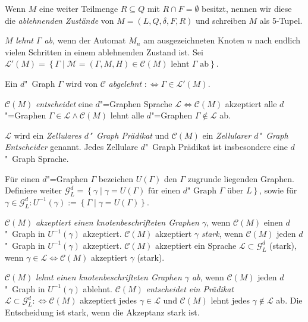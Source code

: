 \documentclass[11pt]{article}
\newcommand{\defWord}[1]{\emph{#1}}
\begin{document}
\begin{definition}
	Wenn $M$ eine weiter Teilmenge $R \subseteq Q$ mit $R \cap F = \emptyset$ besitzt, nennen wir diese die \defWord{ablehnenden Zustände} von $M = \left(L, Q, \delta, F, R\right)$ und schreiben $M$ als 5-Tupel.
	
	$M$ \defWord{lehnt $\Gamma$ ab}, wenn der Automat $M_n$ am ausgezeichneten Knoten $n$ nach endlich vielen Schritten in einem ablehnenden Zustand ist.
	Sei  $\mathcal{L}'\left(M\right) = \left\{\Gamma \mid \mathcal{M} = \left(\Gamma, M, H\right) \in \mathcal{C}\left(M\right) \text{ lehnt } \Gamma \text{ ab}\right\}$.
	
	Ein $d$"~Graph $\Gamma$ wird von $\mathcal{C}$ \defWord{abgelehnt} $:\iff \Gamma \in \mathcal{L}'\left(M\right)$.
	
	$\mathcal{C}\left(M\right)$ \defWord{entscheidet} eine $d$"=Graphen Sprache $\mathcal{L} \iff \mathcal{C}\left(M\right)$ akzeptiert alle $d$"=Graphen $\Gamma \in \mathcal{L} \land \mathcal{C}\left(M\right)$ lehnt alle $d$"=Graphen $\Gamma \notin \mathcal{L}$ ab.
	
	$\mathcal{L}$ wird ein \defWord{Zellulares $d$"~Graph Prädikat} und $\mathcal{C}\left(M\right)$ ein \defWord{Zellularer $d$"~Graph Entscheider} genannt. 
	Jedes Zellulare $d$"~Graph Prädikat ist insbesondere eine $d$"~Graph Sprache.
\end{definition}

\begin{definition}
	Für einen $d$"=Graphen $\Gamma$ bezeichen $U\left(\Gamma\right)$ den $\Gamma$ zugrunde liegenden Graphen. 
	Definiere weiter $\mathcal{G}_L^d = \left\{\gamma \mid \gamma = U\left(\Gamma\right) \text{ für einen $d$"~Graph } \Gamma \text{ über } L\right\}$, sowie für $\gamma \in \mathcal{G}_L^d : U^{-1}\left(\gamma\right) := \left\{\Gamma \mid \gamma = U\left(\Gamma\right)\right\}$.
	
	$\mathcal{C}\left(M\right)$ \defWord{akzeptiert einen knotenbeschrifteten Graphen $\gamma$}, wenn $\mathcal{C}\left(M\right)$ einen $d$"~Graph in $U^{-1}\left(\gamma\right)$ akzeptiert.
	$\mathcal{C}\left(M\right)$ akzeptiert $\gamma$ \defWord{stark}, wenn $\mathcal{C}\left(M\right)$ jeden $d$"~Graph in $U^{-1}\left(\gamma\right)$ akzeptiert.
	$\mathcal{C}\left(M\right)$ akzeptiert ein Sprache $\mathcal{L} \subset \mathcal{G}_L^d$ (stark), wenn $\gamma \in \mathcal{L} \iff \mathcal{C}\left(M\right)$ akzeptiert $\gamma$ (stark). 
	
	$\mathcal{C}\left(M\right)$ \defWord{lehnt einen knotenbeschrifteten Graphen $\gamma$ ab}, wenn $\mathcal{C}\left(M\right)$ jeden $d$"~Graph in $U^{-1}\left(\gamma\right)$ ablehnt.
	$\mathcal{C}\left(M\right)$ \defWord{entscheidet ein Prädikat} $\mathcal{L} \subset \mathcal{G}_L^d :\iff \mathcal{C}\left(M\right)$ akzeptiert jedes $\gamma \in \mathcal{L}$ und $\mathcal{C}\left(M\right)$ lehnt jedes $\gamma \notin \mathcal{L}$ ab.
	Die Entscheidung ist stark, wenn die Akzeptanz stark ist. 
\end{definition}
\end{document}
